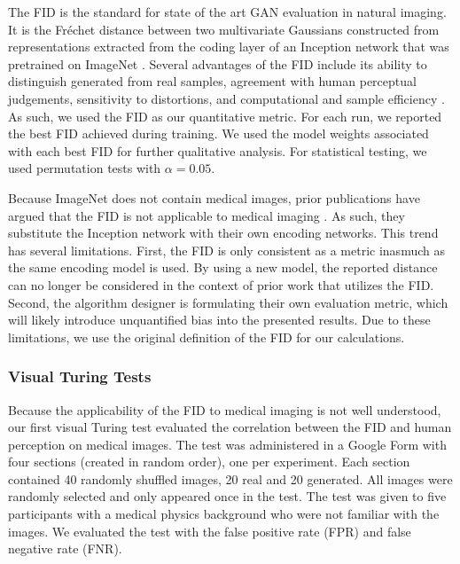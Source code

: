 \documentclass[runningheads]{llncs}
\begin{document}
The FID is the standard for state of the art GAN evaluation in natural imaging.
It is the Fr\'{e}chet distance between two multivariate Gaussians constructed from representations extracted from the coding layer of an Inception network that was pretrained on ImageNet \cite{Heusel2017}.
Several advantages of the FID include its ability to distinguish generated from real samples, agreement with human perceptual judgements, sensitivity to distortions, and computational and sample efficiency \cite{borji2019,Heusel2017}.
As such, we used the FID as our quantitative metric.
For each run, we reported the best FID achieved during training.
We used the model weights associated with each best FID for further qualitative analysis.
For statistical testing, we used permutation tests with $\alpha=0.05$.

Because ImageNet does not contain medical images, prior publications have argued that the FID is not applicable to medical imaging \cite{Chen2021,jung2021eijin,Tronchin2021}.
As such, they substitute the Inception network with their own encoding networks.
This trend has several limitations.
First, the FID is only consistent as a metric inasmuch as the same encoding model is used.
By using a new model, the reported distance can no longer be considered in the context of prior work that utilizes the FID.
Second, the algorithm designer is formulating their own evaluation metric, which will likely introduce unquantified bias into the presented results.
Due to these limitations, we use the original definition of the FID for our calculations.

\subsubsection{Visual Turing Tests}

Because the applicability of the FID to medical imaging is not well understood, our first visual Turing test evaluated the correlation between the FID and human perception on medical images.
The test was administered in a Google Form with four sections (created in random order), one per experiment.
Each section contained 40 randomly shuffled images, 20 real and 20 generated.
All images were randomly selected and only appeared once in the test.
The test was given to five participants with a medical physics background who were not familiar with the images.
We evaluated the test with the false positive rate (FPR) and false negative rate (FNR).
\end{document}
